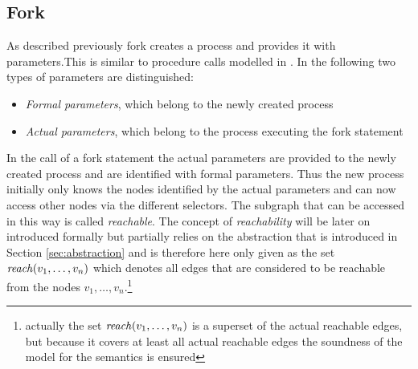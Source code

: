 	\subsection{Fork}
	\label{sec:fork}
	As described previously fork creates a process and provides it with
	parameters.This is similar to procedure calls modelled in
	\cite{ProcedureSummaries}.
	In the following two types of parameters are distinguished:
	\begin{itemize}
		\item \emph{Formal parameters}, which belong to the newly created process
		\item \emph{Actual parameters}, which belong to the process executing the
			fork statement
	\end{itemize}
	In the call of a fork statement the actual parameters are provided to
	the newly created process and are identified with formal parameters.
	Thus the new process initially only knows the nodes identified by the actual
	parameters and can now access other nodes via the different selectors.
	The subgraph that can be accessed in this way is called
	\emph{reachable}. The concept of \emph{reachability} will be later on
	introduced formally but partially relies on the abstraction that is
	introduced in Section \ref{sec:abstraction} and is therefore here only given
	as the set $\mathit{reach}(v_1,\dots,v_n)$ which denotes all edges that are
	considered to be reachable from the nodes $v_1,\dots,v_n$.\footnote{actually
		the set $\mathit{reach}(v_1,\dots,v_n)$ is a superset of the actual reachable
		edges, but because it covers at least all actual reachable edges the
	soundness of the model for the semantics is ensured}

